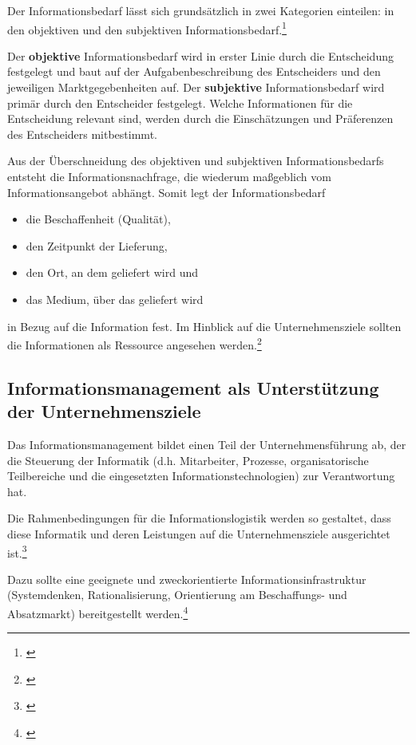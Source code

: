 Der Informationsbedarf lässt sich grundsätzlich in zwei Kategorien einteilen: in den objektiven und den subjektiven Informationsbedarf.\footnote{\cite{picot_grenzenlos_2003}}

Der \textbf{objektive} Informationsbedarf wird in erster Linie durch die Entscheidung festgelegt und baut auf der Aufgabenbeschreibung des Entscheiders und den jeweiligen Marktgegebenheiten auf.
Der \textbf{subjektive} Informationsbedarf wird primär durch den Entscheider festgelegt. Welche Informationen für die Entscheidung relevant sind, werden durch die Einschätzungen und Präferenzen des Entscheiders mitbestimmt.

Aus der Überschneidung des objektiven und subjektiven Informationsbedarfs entsteht die Informationsnachfrage, die wiederum maßgeblich vom Informationsangebot abhängt. Somit legt der Informationsbedarf

\begin{itemize}
	\item die Beschaffenheit (Qualität),
	\item den Zeitpunkt der Lieferung,
	\item den Ort, an dem geliefert wird und
	\item das Medium, über das geliefert wird		 
\end{itemize}
in Bezug auf die Information fest. Im Hinblick auf die Unternehmensziele sollten die Informationen als Ressource angesehen werden.\footnote{\cite{bode_informationsbegriff_1997}} 

\subsection{Informationsmanagement als Unterstützung der Unternehmensziele}
Das Informationsmanagement bildet einen Teil der Unternehmensführung ab, der die Steuerung der Informatik (d.h. Mitarbeiter, Prozesse, organisatorische Teilbereiche und die eingesetzten Informationstechnologien) zur Verantwortung hat.

Die Rahmenbedingungen für die Informationslogistik werden so gestaltet, dass diese Informatik und deren Leistungen auf die Unternehmensziele ausgerichtet ist.\footnote{\cite{voss_informationsmanagement_2001}}

Dazu sollte eine geeignete und zweckorientierte Informationsinfrastruktur (Systemdenken, Rationalisierung, Orientierung am Beschaffungs- und Absatzmarkt) bereitgestellt werden.\footnote{\cite{Vgl. u.a. Vieweger, Bernd; Informationsmanagement; 2013}}
